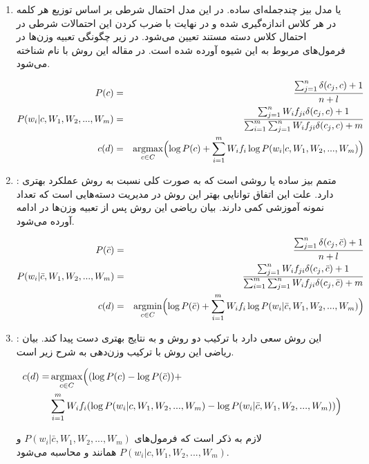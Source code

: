 \documentclass[12pt, a4paper]{article}
\DeclareMathOperator*{\argmax}{argmax}
\DeclareMathOperator*{\argmin}{argmin}
\begin{document}
\begin{enumerate}
    \item {} یا مدل بیز چند‌جمله‌ای ساده. در این مدل احتمال شرطی بر اساس توزیع هر کلمه در هر کلاس
    اندازه‌گیری شده و در نهایت با ضرب کردن این احتمالات شرطی در احتمال کلاس دسته مستند تعیین می‌شود.
    در زیر چگونگی تعبیه وزن‌ها در فرمول‌های مربوط به این شیوه آورده شده است. در مقاله این روش با نام
     شناخته می‌شود.

    \begin{eqnarray}
        P(c) & = & \frac{\sum_{j=1}^{n}\delta(c_j, c) + 1}{n+l} \\
        P(w_i|c, W_1, W_2, ..., W_m) & = & \frac{\sum_{j=1}^{n} W_i f_{ji}\delta(c_j, c) + 1}{\sum_{i=1}^{m}\sum_{j=1}^{n}W_if_{ji}\delta(c_j,c)+m} \\
        c(d) & = & \argmax_{c \in C} \Bigl(\log P(c) + \sum_{i=1}^{m} W_i f_i \log P(w_i| c, W_1, W_2, ..., W_m)\Bigr)
    \end{eqnarray}

    \item {}: متمم بیز ساده یا  روشی است که به صورت کلی
    نسبت به روش  عملکرد بهتری دارد. علت این اتفاق توانایی بهتر این روش در مدیریت
    دسته‌هایی است که تعداد نمونه آموزشی کمی دارند. بیان ریاضی این روش پس از تعبیه وزن‌ها
    در ادامه آورده می‌شود.

    \begin{eqnarray}
        P(\bar{c}) & = & \frac{\sum_{j=1}^{n}\delta(c_j, \bar{c}) + 1}{n+l} \\
        P(w_i|\bar{c}, W_1, W_2, ..., W_m) & = & \frac{\sum_{j=1}^{n} W_i f_{ji}\delta(c_j, \bar{c}) + 1}{\sum_{i=1}^{m}\sum_{j=1}^{n}W_if_{ji}\delta(c_j,\bar{c})+m} \\
        c(d) & = & \argmin_{c \in C} \Bigl(\log P(\bar{c}) + \sum_{i=1}^{m} W_i f_i \log P(w_i| \bar{c}, W_1, W_2, ..., W_m)\Bigr)
    \end{eqnarray}

    \item {}:  این روش سعی دارد با ترکیب دو
    روش  و  به نتایج بهتری دست پیدا کند. بیان ریاضی این روش با ترکیب وزن‌دهی
    به شرح زیر است.

    \begin{eqnarray}
        \begin{split}
            c(d) = & \argmax_{c \in C} \Bigl((\log P(c) - \log P(\bar{c})) + \\
            & \sum_{i=1}^{m} W_i f_i (\log P(w_i| c, W_1, W_2, ..., W_m) - \log P(w_i| \bar{c}, W_1, W_2, ..., W_m)) \Bigr)
        \end{split}
    \end{eqnarray}

    لازم به ذکر است که فرمول‌های $P(w_i|\bar{c}, W_1, W_2, ..., W_m)$
    \break
    و $P(w_i|c, W_1, W_2, ..., W_m)$ همانند  و 
    محاسبه می‌شود.
\end{enumerate}
\end{document}

